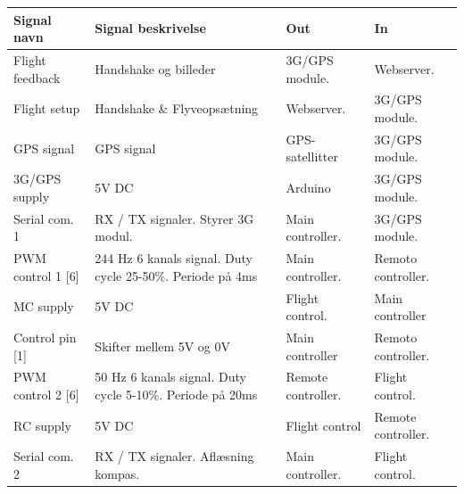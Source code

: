 \begin{table}[H]
	\centering
		\begin{tabular}	{|p{3.1 cm}|p{5.2 cm}|p{2.3 cm}|p{2.3 cm}|}  
								
		\hline
			\textbf{Signal navn} 	& \textbf{Signal beskrivelse}		& \textbf{Out} 		& \textbf{In}     \\ \hline
			Flight feedback		& Handshake og billeder				& 3G/GPS module.				& Webserver.	\\ \hline
			Flight setup		& Handshake \& Flyveopsætning  		& Webserver.			& 3G/GPS \newline module.	\\ \hline
			GPS signal	 		& GPS signal						& GPS-satellitter		& 3G/GPS \newline module.	\\ \hline			
			3G/GPS supply		& 5V DC							 	& Arduino	& 3G/GPS \newline module.    \\ \hline
			Serial com. 1		& RX / TX signaler. \newline Styrer 3G modul.& Main \newline controller. 		& 3G/GPS \newline module.    \\ \hline
			
			
			PWM control 1 [6]	& 244 Hz 6 kanals signal. Duty \newline cycle 25-50\%. Periode på 4ms	& Main \newline controller.	& Remoto \newline controller.	\\ \hline
			MC supply		& 5V DC							 	& Flight \newline control. 	& Main \newline controller    \\ \hline
			Control pin [1]		& Skifter mellem 5V og 0V							 	& Main \newline controller	& Remoto \newline  controller.    \\ \hline
			
			PWM control 2 [6]	& 50 Hz 6 kanals signal. Duty \newline cycle 5-10\%. Periode på 20ms	& Remote \newline controller.	& Flight \newline control.	\\ \hline		RC supply			& 5V DC							 	& Flight control	& Remote \newline controller.    \\ \hline
			Serial com. 2		& RX / TX signaler. \newline Aflæsning kompas. & Main \newline controller.	& Flight \newline control.	\\ \hline 	
			

\end{tabular}
\end{table}
